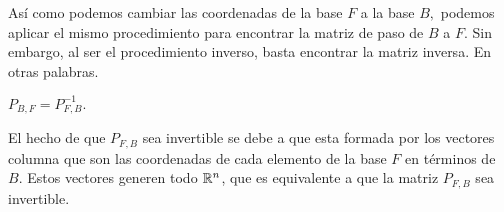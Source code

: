 Así como podemos cambiar las coordenadas de la base $F$ a la base $B,$ podemos aplicar el mismo procedimiento para
encontrar la matriz de paso de $B$ a $F$. Sin embargo, al ser el procedimiento inverso, basta encontrar la matriz
inversa. En otras palabras.

\begin{prop}
\label{PBF}
 $P_{B,F}=P_{F,B}^{-1}.$
\end{prop}

\begin{rem}
 El hecho de que $P_{F,B}$ sea invertible se debe a que esta formada por los vectores columna que son las coordenadas
de cada elemento de la base $F$ en términos de $B.$ Estos vectores generen todo $\mathbb{R}^{n}$, que es equivalente a
que la matriz $P_{F,B}$ sea invertible.
\end{rem}

